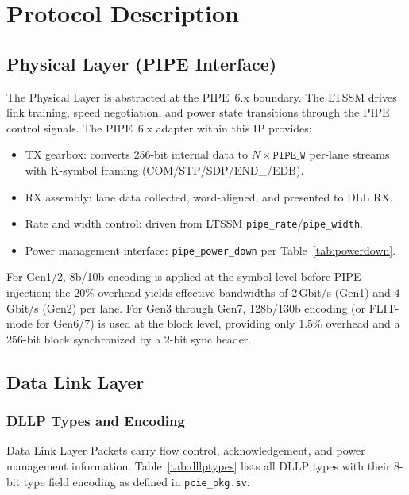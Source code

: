 \documentclass[11pt,a4paper]{article}
\begin{document}
\section{Protocol Description}

\subsection{Physical Layer (PIPE Interface)}

The Physical Layer is abstracted at the PIPE~6.x boundary. The LTSSM drives
link training, speed negotiation, and power state transitions through the PIPE
control signals. The PIPE~6.x adapter within this IP provides:

\begin{itemize}[noitemsep]
  \item TX gearbox: converts 256-bit internal data to $N \times \texttt{PIPE\_W}$
    per-lane streams with K-symbol framing (COM/STP/SDP/END\_/EDB).
  \item RX assembly: lane data collected, word-aligned, and presented to DLL RX.
  \item Rate and width control: driven from LTSSM \texttt{pipe\_rate}/\texttt{pipe\_width}.
  \item Power management interface: \texttt{pipe\_power\_down} per Table~\ref{tab:powerdown}.
\end{itemize}

For Gen1/2, 8b/10b encoding is applied at the symbol level before PIPE injection;
the 20\% overhead yields effective bandwidths of 2\,Gbit/s (Gen1) and 4\,Gbit/s (Gen2)
per lane. For Gen3 through Gen7, 128b/130b encoding (or FLIT-mode for Gen6/7) is used
at the block level, providing only 1.5\% overhead and a 256-bit block synchronized
by a 2-bit sync header.

\subsection{Data Link Layer}

\subsubsection{DLLP Types and Encoding}

Data Link Layer Packets carry flow control, acknowledgement, and power management
information. Table~\ref{tab:dllptypes} lists all DLLP types with their 8-bit type
field encoding as defined in \texttt{pcie\_pkg.sv}.
\end{document}
